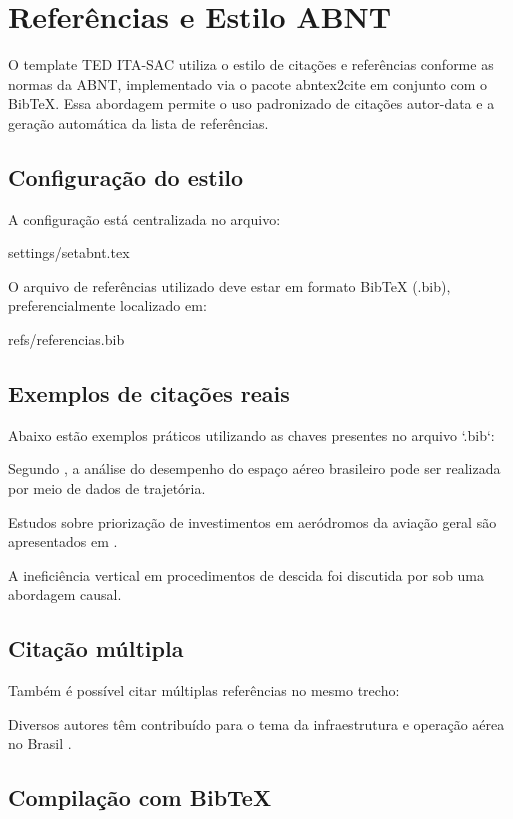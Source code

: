 \chapter{Referências e Estilo ABNT}

O template TED ITA-SAC utiliza o estilo de citações e referências conforme as normas da ABNT, implementado via o pacote abntex2cite em conjunto com o BibTeX. Essa abordagem permite o uso padronizado de citações autor-data e a geração automática da lista de referências.

\section{Configuração do estilo}

A configuração está centralizada no arquivo:

settings/setabnt.tex

O arquivo de referências utilizado deve estar em formato BibTeX (.bib), preferencialmente localizado em:

refs/referencias.bib

\section{Exemplos de citações reais}

Abaixo estão exemplos práticos utilizando as chaves presentes no arquivo `.bib`:

Segundo , a análise do desempenho do espaço aéreo brasileiro pode ser realizada por meio de dados de trajetória.

Estudos sobre priorização de investimentos em aeródromos da aviação geral são apresentados em \cite{caetano2022criteria}.

A ineficiência vertical em procedimentos de descida foi discutida por \cite{szenczuk2021causalvertical} sob uma abordagem causal.

\section{Citação múltipla}

Também é possível citar múltiplas referências no mesmo trecho:

Diversos autores têm contribuído para o tema da infraestrutura e operação aérea no Brasil \cite{murca2020characterizing, caetano2022criteria, szenczuk2021causalvertical}.


\section{Compilação com BibTeX}

